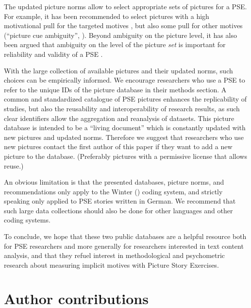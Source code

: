 \documentclass[man,a4paper,mask]{apa6}\usepackage[]{graphicx}\usepackage[]{color}
\begin{document}
The updated picture norms allow to select appropriate sets of pictures for a PSE. For example, it has been recommended to select pictures with a high motivational pull for the targeted motives \parencite{schultheiss_MeasuringImplicitMotives_2007,smith_MethodologicalConsiderationsSteps_1992}, but also some pull for other motives (``picture cue ambiguity'', ). Beyond ambiguity on the picture level, it has also been argued that ambiguity on the level of the picture \emph{set} is important for reliability and validity of a PSE \parencite{ramsay_SetAmbiguityKey_2013}. 

With the large collection of available pictures and their updated norms, such choices can be empirically informed. We encourage researchers who use a PSE to refer to the unique IDs of the picture database in their methods section. A common and standardized catalogue of PSE pictures enhances the replicability of studies, but also the reusability and interoperability of research results, as such clear identifiers allow the aggregation and reanalysis of datasets. 
This picture database is intended to be a ``living document'' which is constantly updated with new pictures and updated norms. Therefore we suggest that researchers who use new pictures contact the first author of this paper if they want to add a new picture to the database. (Preferably pictures with a permissive license that allows reuse.) 

An obvious limitation is that the presented databases, picture norms, and recommendations only apply to the Winter (\citeyear{winter_ManualScoringMotive_1994}) coding system, and strictly speaking only applied to PSE stories written in German. We recommend that such large data collections should also be done for other languages and other coding systems.

To conclude, we hope that these two public databases are a helpful resource both for PSE researchers and more generally for researchers interested in text content analysis, and that they refuel interest in methodological and psychometric research about measuring implicit motives with Picture Story Exercises.

\section{Author contributions}
\end{document}
